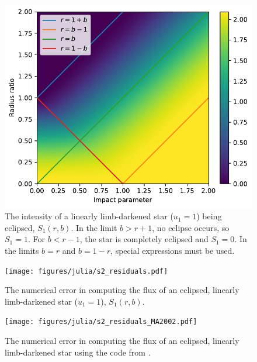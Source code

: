 \documentclass[modern]{aastex61}
\begin{document}
\begin{figure}\label{transit_linear}
    \begin{centering}
    \includegraphics[width=0.85\linewidth]{figures/julia/transit_linear.pdf}
    \caption{The intensity of a linearly limb-darkened star ($u_1=1$) being
    eclipsed, $S_1(r,b)$.
    In the limit $b > r+1$, no eclipse occurs, so $S_1=1$.  For $b < r-1$, the star
    is completely eclipsed and $S_1=0$.  In the limits $b=r$ and $b=1-r$, special
    expressions must be used.
    }
    \end{centering}
\end{figure}

\begin{figure}\label{s2_plot}
    \begin{centering}
    \texttt{[image: figures/julia/s2\_residuals.pdf]}
    \caption{The numerical error in computing the flux of an eclipsed, linearly
    limb-darkened star ($u_1=1$), $S_1(r,b)$. }
    \end{centering}
\end{figure}

\begin{figure}\label{s2_plot_MA2002}
    \begin{centering}
    \texttt{[image: figures/julia/s2\_residuals\_MA2002.pdf]}
    \caption{The numerical error in computing the flux of an eclipsed, linearly
             limb-darkened star using the code from \citet{MandelAgol2002}.
             }
    \end{centering}
\end{figure}
\end{document}
